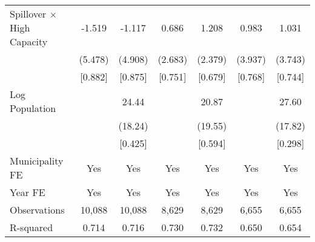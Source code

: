\documentclass[]{article}
\begin{document}
\begin{adjustbox}{max width=\textwidth}
\begin{tabular}{lcccccc}
Spillover $\times$ High Capacity & -1.519 & -1.117 & 0.686 & 1.208 & 0.983 & 1.031 \\
& (5.478) & (4.908) & (2.683) & (2.379) & (3.937) & (3.743) \\
& [0.882] & [0.875] & [0.751] & [0.679] & [0.768] & [0.744] \\
[0.5em]

Log Population & & 24.44 & & 20.87 & & 27.60 \\
& & (18.24) & & (19.55) & & (17.82) \\
& & [0.425] & & [0.594] & & [0.298] \\

\midrule
Municipality FE & Yes & Yes & Yes & Yes & Yes & Yes \\
Year FE & Yes & Yes & Yes & Yes & Yes & Yes \\
Observations & 10,088 & 10,088 & 8,629 & 8,629 & 6,655 & 6,655 \\
R-squared & 0.714 & 0.716 & 0.730 & 0.732 & 0.650 & 0.654 \\
\bottomrule
\end{tabular}
\end{adjustbox}
\end{document}
